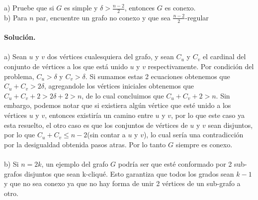 \documentclass[12pt]{article}
\newenvironment{ejercicio}[2][Ejercicio]{\begin{trivlist}
\item[\hskip \labelsep {\bfseries #1}\hskip \labelsep {\bfseries #2.}]}{\end{trivlist}}
\begin{document}
\begin{ejercicio}{1.1.13}
\end{ejercicio}
a) Pruebe que si $G$ es simple y $\delta > \frac{n-2}{2}$, entonces $G$ es conexo. 
\\
b) Para $n$ par, encuentre un grafo no conexo y que sea $\frac{n-2}{2}$-regular
\\\\
\textbf{Solución.} 
\\\\
a) Sean $u$ y $v$ dos vértices cualesquiera del grafo, y sean $C_u$ y $C_v$ el cardinal del conjunto de vértices a los que está unido $u$ y $v$ respectivamente. Por condición del problema, $C_u > \delta$ y $C_v > \delta$. Si sumamos estas 2 ecuaciones obtenemos que $C_u + C_v > 2\delta$, agregandole los vértices iniciales obtenemos que $C_u + C_v + 2 > 2\delta + 2 > n$, de lo cual concluimos que $C_u + C_v +2 > n$. Sin embargo, podemos notar que si existiera algún vértice que esté unido a los vértices $u$ y $v$, entonces existiría un camino entre $u$ y $v$, por lo que este caso ya esta resuelto, el otro caso es que los conjuntos de vértices de $u$ y $v$ sean disjuntos, por lo que $C_u + C_v \leq  n-2$(sin contar a $u$ y $v$), lo cual sería una contradicción por la desigualdad obtenida pasos atras. Por lo tanto $G$ siempre es conexo.
\\\\
b) Si $n=2k$, un ejemplo del grafo $G$ podría ser que esté conformado por 2 sub-grafos disjuntos que sean k-cliqué. Esto garantiza que todos los grados sean $k-1$ y que no sea conexo ya que no hay forma de unir 2 vértices de un sub-grafo a otro.
\end{document}
